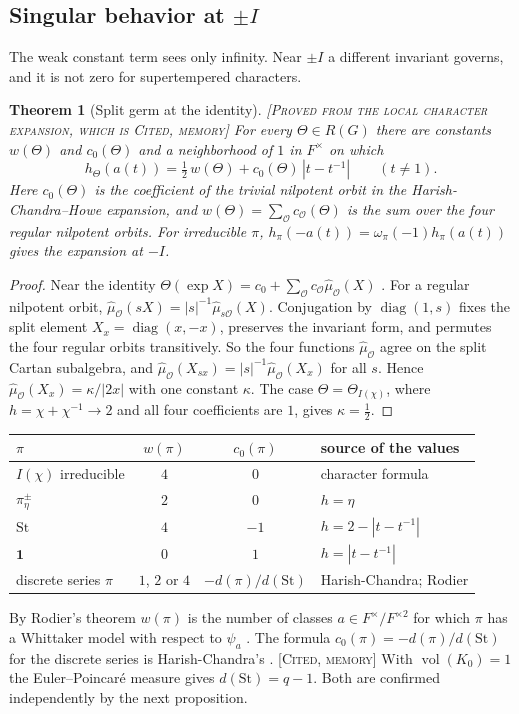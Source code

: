 \documentclass[12pt,letterpaper]{amsart}
\numberwithin{equation}{section}
\newtheorem{theorem}{Theorem}[section]
\theoremstyle{definition}
\theoremstyle{remark}
\newcommand{\St}{\mathrm{St}}
\newcommand{\triv}{\mathbf 1}
\newcommand{\vol}{\operatorname{vol}}
\newcommand{\status}[1]{\textup{[\textsc{#1}]}}
\begin{document}
\subsection{Singular behavior at $\pm I$}\label{sub:germ}
The weak constant term sees only infinity. Near $\pm I$ a different invariant governs, and it is not zero for supertempered characters.

\begin{theorem}[Split germ at the identity]\label{thm:germ}\status{Proved from the local character expansion, which is Cited, memory}
For every $\Theta\in R(G)$ there are constants $w(\Theta)$ and $c_0(\Theta)$ and a neighborhood of $1$ in $F^\times$ on which
\[
h_\Theta(a(t))=\tfrac12\,w(\Theta)+c_0(\Theta)\,|t-t^{-1}|\qquad(t\ne1).
\]
Here $c_0(\Theta)$ is the coefficient of the trivial nilpotent orbit in the Harish-Chandra--Howe expansion, and $w(\Theta)=\sum_{\mathcal O}c_{\mathcal O}(\Theta)$ is the sum over the four regular nilpotent orbits. For irreducible $\pi$, $h_\pi(-a(t))=\omega_\pi(-1)h_\pi(a(t))$ gives the expansion at $-I$.
\end{theorem}
\begin{proof}
Near the identity $\Theta(\exp X)=c_0+\sum_{\mathcal O}c_{\mathcal O}\widehat\mu_{\mathcal O}(X)$ \cite{HC99}. For a regular nilpotent orbit, $\widehat\mu_{\mathcal O}(sX)=|s|^{-1}\widehat\mu_{s\mathcal O}(X)$. Conjugation by $\operatorname{diag}(1,s)$ fixes the split element $X_x=\operatorname{diag}(x,-x)$, preserves the invariant form, and permutes the four regular orbits transitively. So the four functions $\widehat\mu_{\mathcal O}$ agree on the split Cartan subalgebra, and $\widehat\mu_{\mathcal O}(X_{sx})=|s|^{-1}\widehat\mu_{\mathcal O}(X_x)$ for all $s$. Hence $\widehat\mu_{\mathcal O}(X_x)=\kappa/|2x|$ with one constant $\kappa$. The case $\Theta=\Theta_{I(\chi)}$, where $h=\chi+\chi^{-1}\to2$ and all four coefficients are $1$, gives $\kappa=\tfrac12$.
\end{proof}

\begin{center}\small
\begin{tabular}{@{}lccl@{}}\toprule
$\pi$ & $w(\pi)$ & $c_0(\pi)$ & source of the values\\\midrule
$I(\chi)$ irreducible & $4$ & $0$ & character formula\\
$\pi_\eta^\pm$ & $2$ & $0$ & $h=\eta$\\
$\St$ & $4$ & $-1$ & $h=2-|t-t^{-1}|$\\
$\triv$ & $0$ & $1$ & $h=|t-t^{-1}|$\\
discrete series $\pi$ & $1$, $2$ or $4$ & $-d(\pi)/d(\St)$ & Harish-Chandra; Rodier\\\bottomrule
\end{tabular}
\end{center}
By Rodier's theorem $w(\pi)$ is the number of classes $a\in F^\times/F^{\times2}$ for which $\pi$ has a Whittaker model with respect to $\psi_a$ \cite{Ro75}. The formula $c_0(\pi)=-d(\pi)/d(\St)$ for the discrete series is Harish-Chandra's \cite{HC99}. \status{Cited, memory} With $\vol(K_0)=1$ the Euler--Poincar\'e measure gives $d(\St)=q-1$. Both are confirmed independently by the next proposition.
\end{document}
